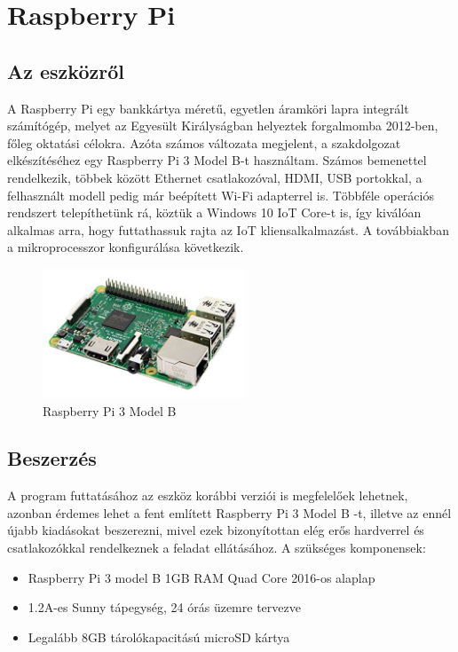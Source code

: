 \documentclass[a4paper,12pt]{report}
\begin{document}
\section{Raspberry Pi}

\subsection{Az eszközről}
    A Raspberry Pi egy bankkártya méretű, egyetlen áramköri lapra integrált számítógép, melyet az Egyesült Királyságban
    helyeztek forgalmomba 2012-ben, főleg oktatási célokra. Azóta számos változata megjelent, a szakdolgozat elkészítéséhez
    egy Raspberry Pi 3 Model B-t használtam. Számos bemenettel rendelkezik, többek között Ethernet csatlakozóval, HDMI, USB
    portokkal, a felhasznált modell pedig már beépített Wi-Fi adapterrel is. Többféle operációs rendszert telepíthetünk rá,
    köztük a Windows 10 IoT Core-t is, így kiválóan alkalmas arra, hogy futtathassuk rajta az IoT kliensalkalmazást. A továbbiakban
    a mikroprocesszor konfigurálása következik.

\begin{figure}[h!]
    \hspace{5cm}
    \includegraphics[width=6cm]{images/raspberry_pi3.jpg}
    \caption{Raspberry Pi 3 Model B}
    \label{fig: Raspberry Pi 3}
\end{figure}

\subsection{Beszerzés}
    A program futtatásához az eszköz korábbi verziói is megfelelőek lehetnek, azonban érdemes lehet a fent említett Raspberry Pi 3
    Model B -t, illetve az ennél újabb kiadásokat beszerezni, mivel ezek bizonyítottan elég erős hardverrel és csatlakozókkal rendelkeznek
    a feladat ellátásához. A szükséges komponensek:

\begin{itemize}
    \item Raspberry Pi 3 model B 1GB RAM Quad Core 2016-os alaplap
    \item 1.2A-es Sunny tápegység, 24 órás üzemre tervezve
    \item Legalább 8GB tárolókapacitású microSD kártya
\end{itemize}
\end{document}
